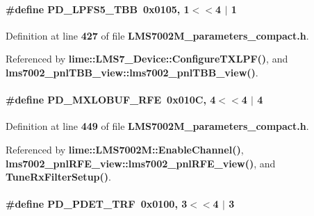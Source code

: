 \paragraph[{P\+D\+\_\+\+L\+P\+F\+S5\+\_\+\+T\+BB}]{\setlength{\rightskip}{0pt plus 5cm}\#define P\+D\+\_\+\+L\+P\+F\+S5\+\_\+\+T\+BB~0x0105, 1$<$$<$4 $\vert$  1}\label{LMS7002M__parameters__compact_8h_a54e43c0a150455929a224c828c00c439}


Definition at line {\bf 427} of file {\bf L\+M\+S7002\+M\+\_\+parameters\+\_\+compact.\+h}.



Referenced by {\bf lime\+::\+L\+M\+S7\+\_\+\+Device\+::\+Configure\+T\+X\+L\+P\+F()}, and {\bf lms7002\+\_\+pnl\+T\+B\+B\+\_\+view\+::lms7002\+\_\+pnl\+T\+B\+B\+\_\+view()}.

\paragraph[{P\+D\+\_\+\+M\+X\+L\+O\+B\+U\+F\+\_\+\+R\+FE}]{\setlength{\rightskip}{0pt plus 5cm}\#define P\+D\+\_\+\+M\+X\+L\+O\+B\+U\+F\+\_\+\+R\+FE~0x010\+C, 4$<$$<$4 $\vert$  4}\label{LMS7002M__parameters__compact_8h_a9ba77712147595f67f5a3dfb35c76a81}


Definition at line {\bf 449} of file {\bf L\+M\+S7002\+M\+\_\+parameters\+\_\+compact.\+h}.



Referenced by {\bf lime\+::\+L\+M\+S7002\+M\+::\+Enable\+Channel()}, {\bf lms7002\+\_\+pnl\+R\+F\+E\+\_\+view\+::lms7002\+\_\+pnl\+R\+F\+E\+\_\+view()}, and {\bf Tune\+Rx\+Filter\+Setup()}.

\paragraph[{P\+D\+\_\+\+P\+D\+E\+T\+\_\+\+T\+RF}]{\setlength{\rightskip}{0pt plus 5cm}\#define P\+D\+\_\+\+P\+D\+E\+T\+\_\+\+T\+RF~0x0100, 3$<$$<$4 $\vert$  3}\label{LMS7002M__parameters__compact_8h_a724928751628485d4ebc2854c6498741}


